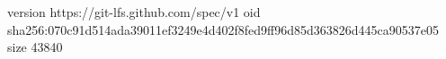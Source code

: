 version https://git-lfs.github.com/spec/v1
oid sha256:070c91d514ada39011ef3249e4d402f8fed9ff96d85d363826d445ca90537e05
size 43840
